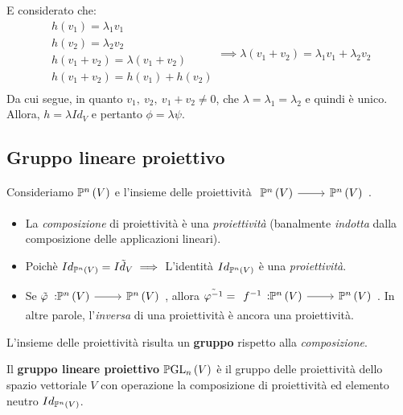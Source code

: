 \begin{demonstration}
\begin{equation*}
\end{equation*}
E considerato che:
\begin{equation*}
	\begin{array}{l}
		h\left(v_1\right)=\lambda_1 v_1\\
		h\left(v_2\right)=\lambda_2 v_2\\
		h\left(v_1+v_2\right)=\lambda\left(v_1+v_2\right)\\
		h\left(v_1+v_2\right)=h\left(v_1\right)+h\left(v_2\right)\\
	\end{array}
	\implies \lambda\left(v_1+v_2\right)=\lambda_1 v_1+\lambda_2 v_2
\end{equation*}
Da cui segue, in quanto $v_1,\ v_2,\ v_1+v_2\neq 0$, che $\lambda=\lambda_1=\lambda_2$ e quindi è unico.\\
Allora, $h=\lambda Id_{V}$ e pertanto $\phi=\lambda \psi$.
\end{demonstration}
\subsection{Gruppo lineare proiettivo}
\begin{observe}
	Consideriamo $\proj{V}$ e l'insieme delle proiettività $\funz{\ }{\proj{V}}{\proj{V}}$.
	\begin{itemize}
		\item La \textit{composizione} di proiettività è una \textit{proiettività} (banalmente \textit{indotta} dalla composizione delle applicazioni lineari).
		\item Poichè $Id_{\proj{V}}=\tilde{Id_V}\implies$ L'identità $Id_{\proj{V}}$ è una \textit{proiettività}.
		\item Se $\tilde{\phi}\! \funz{\! }{\proj{V}}{\proj{V}}$, allora $\tilde{\phi^{-1}}=\funz{f^{-1}}{\proj{V}}{\proj{V}}$. In altre parole, l'\textit{inversa} di una proiettività è ancora una proiettività.
	\end{itemize}
L'insieme delle proiettività risulta un \textbf{gruppo} rispetto alla \textit{composizione}.
\end{observe}
\begin{define}
Il \textbf{gruppo lineare proiettivo} $\projgl{V}$ è il gruppo delle proiettività dello spazio vettoriale $V$ con operazione la composizione di proiettività ed elemento neutro $Id_{\proj{V}}$. 
\end{define}
